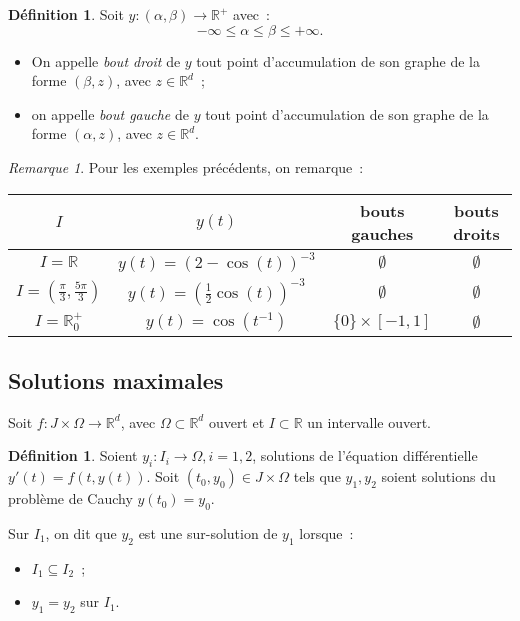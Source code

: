 \documentclass{report}
\theoremstyle{definition}
\newtheorem{déf}[thm]{Définition}
\theoremstyle{remark}
\newtheorem*{rmq}{Remarque}
\numberwithin{equation}{section}
\newcommand{\R}{\mathbb R}
\newcommand{\Rp}{\R^{+}}
\newcommand{\minfty}{{-\infty}}
\newcommand{\pinfty}{{+\infty}}
\begin{document}
			\begin{déf} Soit $y : (\alpha, \beta) \to \Rp$ avec~:
			\begin{equation}
				\minfty \leq \alpha \leq \beta \leq \pinfty.
			\end{equation}

			\begin{itemize}
				\item On appelle \textit{bout droit}  de $y$ tout point d'accumulation de son graphe de la forme $(\beta, z)$, avec $z \in \R^d$~;
				\item on appelle \textit{bout gauche} de $y$ tout point d'accumulation de son graphe de la forme $(\alpha, z)$, avec $z \in \R^d$.
			\end{itemize}
			\end{déf}

			\begin{rmq} Pour les exemples précédents, on remarque~:

			\begin{center}
				\begin{tabular}{|c|c|c|c|}
				\hline
				$I$ & $y(t)$ & bouts gauches & bouts droits \\ \hline  \hline
				$I = \R$ & $y(t) = (2-\cos(t))^{-3}$ & $\emptyset$ & $\emptyset$ \\ \hline
				$I = \left(\frac \pi3, \frac {5\pi}3\right)$ & $y(t) = \left(\frac 12 \cos(t)\right)^{-3}$ & $\emptyset$ & $\emptyset$ \\ \hline
				$I = \Rp_0$ & $y(t) = \cos(t^{-1})$ & $\{0\} \times [-1, 1]$ & $\emptyset$ \\
				\hline
				\end{tabular}
			\end{center}
			\end{rmq}

		\subsection{Solutions maximales}
			Soit $f : J \times \Omega \to \R^d$, avec $\Omega \subset \R^d$ ouvert et $I \subset \R$ un intervalle ouvert.

			\begin{déf} Soient $y_i : I_i \to \Omega, i=1, 2$, solutions de l'équation différentielle $y'(t) = f(t, y(t))$. Soit $(t_0, y_0) \in J \times \Omega$
			tels que $y_1, y_2$ soient solutions du problème de Cauchy $y(t_0) = y_0$.

			Sur $I_1$, on dit que $y_2$ est une sur-solution de $y_1$ lorsque~:
			\begin{itemize}
				\item $I_1 \subseteq I_2$~;
				\item $y_1 = y_2$ sur $I_1$.
			\end{itemize}
			\end{déf}
\end{document}
